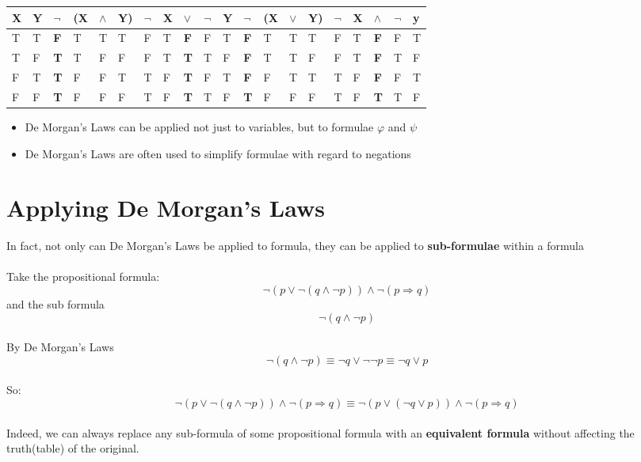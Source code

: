 \documentclass{article}[18pt]
\begin{document}
\begin{tabular}{|l|l|llll|lllll||llll|lllll}
\cline{1-2}
X & Y & $\lnot$    & (X & $\land$ & Y) & $\lnot$ & X & $\lor$     & $\lnot$ & Y & $\lnot$    & (X & $\lor$ & Y) & $\lnot$ & X & $\land$    & $\lnot$ & y \\ \hline
T & T & \textbf{F} & T  & T       & T  & F       & T & \textbf{F} & F       & T & \textbf{F} & T  & T      & T  & F       & T & \textbf{F} & F       & T \\ \cline{1-2}
T & F & \textbf{T} & T  & F       & F  & F       & T & \textbf{T} & T       & F & \textbf{F} & T  & T      & F  & F       & T & \textbf{F} & T       & F \\ \cline{1-2}
F & T & \textbf{T} & F  & F       & T  & T       & F & \textbf{T} & F       & T & \textbf{F} & F  & T      & T  & T       & F & \textbf{F} & F       & T \\ \cline{1-2}
F & F & \textbf{T} & F  & F       & F  & T       & F & \textbf{T} & T       & F & \textbf{T} & F  & F      & F  & T       & F & \textbf{T} & T       & F \\ \cline{1-2}
\end{tabular}
\begin{itemize}
\item De Morgan's Laws can be applied not just to variables, but to formulae $\varphi$ and $\psi$
\item De Morgan's Laws are often used to simplify formulae with regard to negations
\end{itemize}
\section{Applying De Morgan's Laws}
In fact, not only can De Morgan's Laws be applied to formula, they can be applied to \textbf{sub-formulae} within a formula\\
\\
Take the propositional formula:
$$\lnot(p\lor\lnot(q\land\lnot p))\land\lnot(p\Rightarrow q)$$
and the sub formula
$$\lnot(q\land\lnot p)$$
\\
By De Morgan's Laws
$$\lnot(q\land\lnot p)\equiv \lnot q \lor \lnot \lnot p\equiv \lnot q \lor p$$
\\
So:
$$\lnot(p\lor \lnot(q\land\lnot p))\land \lnot(p\Rightarrow q)\equiv \lnot(p\lor(\lnot q \lor p))\land \lnot (p\Rightarrow q)$$
\\
Indeed, we can always replace any sub-formula of some propositional formula with an \textbf{equivalent formula} without affecting the truth(table) of the original.
\end{document}
